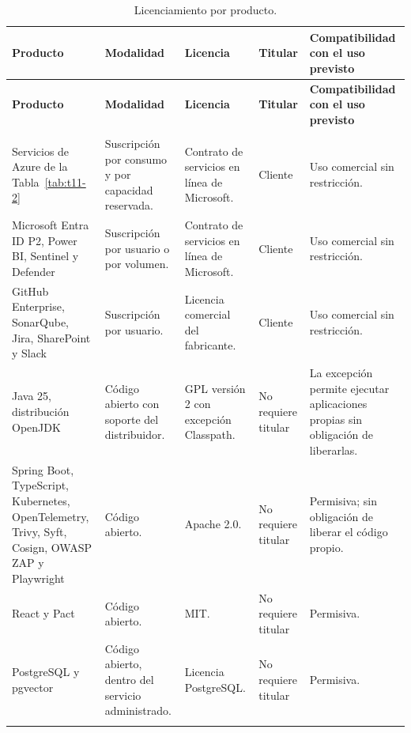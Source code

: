\documentclass[11pt]{article}
\begin{document}
\begin{longtable}[]{@{}
  >{\raggedright\arraybackslash}p{}
  >{\raggedright\arraybackslash}p{}
  >{\raggedright\arraybackslash}p{}
  >{\raggedright\arraybackslash}p{}
  >{\raggedright\arraybackslash}p{}@{}}
\caption{Licenciamiento por producto.}\label{tab:t11-11}\\
\toprule\noalign{}
\textbf{Producto} & \textbf{Modalidad} & \textbf{Licencia} & \textbf{Titular} & \textbf{Compatibilidad con el uso previsto} \\
\midrule\noalign{}
\endfirsthead
\toprule\noalign{}
\textbf{Producto} & \textbf{Modalidad} & \textbf{Licencia} & \textbf{Titular} & \textbf{Compatibilidad con el uso previsto} \\
\midrule\noalign{}
\endhead
\bottomrule\noalign{}
\multicolumn{5}{@{}p{\columnwidth}@{}}{\rule{0pt}{3.2ex}\textbf{Fuente:} Elaboración propia.} \\
\endlastfoot
Servicios de Azure de la Tabla~\mbox{\ref{tab:t11-2}} & Suscripción por consumo y por capacidad reservada. & Contrato de servicios en línea de Microsoft. & Cliente & Uso comercial sin restricción. \\ \addlinespace
Microsoft Entra ID P2, Power BI, Sentinel y Defender & Suscripción por usuario o por volumen. & Contrato de servicios en línea de Microsoft. & Cliente & Uso comercial sin restricción. \\ \addlinespace
GitHub Enterprise, SonarQube, Jira, SharePoint y Slack & Suscripción por usuario. & Licencia comercial del fabricante. & Cliente & Uso comercial sin restricción. \\ \addlinespace
Java 25, distribución OpenJDK & Código abierto con soporte del distribuidor. & GPL versión 2 con excepción Classpath. & No requiere titular & La excepción permite ejecutar aplicaciones propias sin obligación de liberarlas. \\ \addlinespace
Spring Boot, TypeScript, Kubernetes, OpenTelemetry, Trivy, Syft, Cosign, OWASP ZAP y Playwright & Código abierto. & Apache 2.0. & No requiere titular & Permisiva; sin obligación de liberar el código propio. \\ \addlinespace
React y Pact & Código abierto. & MIT. & No requiere titular & Permisiva. \\ \addlinespace
PostgreSQL y pgvector & Código abierto, dentro del servicio administrado. & Licencia PostgreSQL. & No requiere titular & Permisiva. \\ \addlinespace

\end{longtable}
\end{document}
